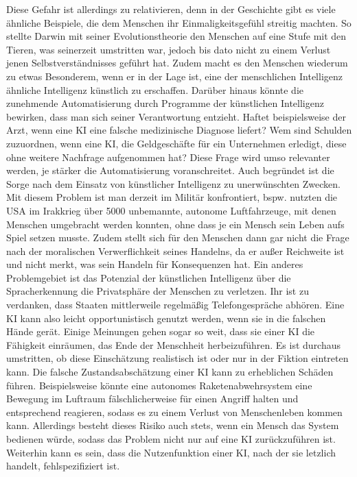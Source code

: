 Diese Gefahr ist allerdings zu relativieren, denn in der Geschichte gibt es viele ähnliche Beispiele, die dem Menschen ihr Einmaligkeitsgefühl streitig machten.
So stellte Darwin mit seiner Evolutionstheorie den Menschen auf eine Stufe mit den Tieren, was seinerzeit umstritten war, jedoch bis dato nicht zu einem Verlust jenen Selbstverständnisses geführt hat.
Zudem macht es den Menschen wiederum zu etwas Besonderem, wenn er in der Lage ist, eine der menschlichen Intelligenz ähnliche Intelligenz künstlich zu erschaffen.
Darüber hinaus könnte die zunehmende Automatisierung durch Programme der künstlichen Intelligenz bewirken, dass man sich seiner Verantwortung entzieht.
Haftet beispielsweise der Arzt, wenn eine KI eine falsche medizinische Diagnose liefert? Wem sind Schulden zuzuordnen, wenn eine KI, die Geldgeschäfte für ein Unternehmen erledigt, diese ohne weitere Nachfrage aufgenommen hat? Diese Frage wird umso relevanter werden, je stärker die Automatisierung voranschreitet.
Auch begründet ist die Sorge nach dem Einsatz von künstlicher Intelligenz zu unerwünschten Zwecken.
Mit diesem Problem ist man derzeit im Militär konfrontiert, bspw.
nutzten die USA im Irakkrieg über 5000 unbemannte, autonome Luftfahrzeuge, mit denen Menschen umgebracht werden konnten, ohne dass je ein Mensch sein Leben aufs Spiel setzen musste.
Zudem stellt sich für den Menschen dann gar nicht die Frage nach der moralischen Verwerflichkeit seines Handelns, da er außer Reichweite ist und nicht merkt, was sein Handeln für Konsequenzen hat.
Ein anderes Problemgebiet ist das Potenzial der künstlichen Intelligenz über die Spracherkennung die Privatsphäre der Menschen zu verletzen.
Ihr ist zu verdanken, dass Staaten mittlerweile regelmäßig Telefongespräche abhören.
Eine KI kann also leicht opportunistisch genutzt werden, wenn sie in die falschen Hände gerät.
Einige Meinungen gehen sogar so weit, dass sie einer KI die Fähigkeit einräumen, das Ende der Menschheit herbeizuführen.
Es ist durchaus umstritten, ob diese Einschätzung realistisch ist oder nur in der Fiktion eintreten kann.
Die falsche Zustandsabschätzung einer KI kann zu erheblichen Schäden führen.
Beispielsweise könnte eine autonomes Raketenabwehrsystem eine Bewegung im Luftraum fälschlicherweise für einen Angriff halten und entsprechend reagieren, sodass es zu einem Verlust von Menschenleben kommen kann.
Allerdings besteht dieses Risiko auch stets, wenn ein Mensch das System bedienen würde, sodass das Problem nicht nur auf eine KI zurückzuführen ist.
Weiterhin kann es sein, dass die Nutzenfunktion einer KI, nach der sie letzlich handelt, fehlspezifiziert ist.
